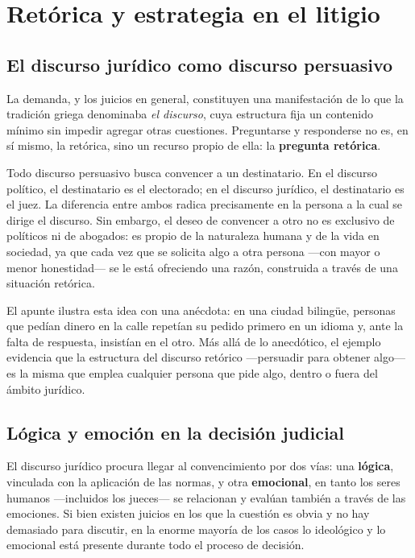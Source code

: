 \documentclass[12pt,oneside]{book}
\begin{document}
\chapter[Retórica y estrategia en el litigio]{Retórica y estrategia en el litigio}

\section{El discurso jurídico como discurso persuasivo}

La demanda, y los juicios en general, constituyen una manifestación de lo que la tradición griega denominaba \textit{el discurso}, cuya estructura fija un contenido mínimo sin impedir agregar otras cuestiones. Preguntarse y responderse no es, en sí mismo, la retórica, sino un recurso propio de ella: la \textbf{pregunta retórica}.

Todo discurso persuasivo busca convencer a un destinatario. En el discurso político, el destinatario es el electorado; en el discurso jurídico, el destinatario es el juez. La diferencia entre ambos radica precisamente en la persona a la cual se dirige el discurso. Sin embargo, el deseo de convencer a otro no es exclusivo de políticos ni de abogados: es propio de la naturaleza humana y de la vida en sociedad, ya que cada vez que se solicita algo a otra persona —con mayor o menor honestidad— se le está ofreciendo una razón, construida a través de una situación retórica.

\begin{note}
El apunte ilustra esta idea con una anécdota: en una ciudad bilingüe, personas que pedían dinero en la calle repetían su pedido primero en un idioma y, ante la falta de respuesta, insistían en el otro. Más allá de lo anecdótico, el ejemplo evidencia que la estructura del discurso retórico —persuadir para obtener algo— es la misma que emplea cualquier persona que pide algo, dentro o fuera del ámbito jurídico.
\end{note}

\section{Lógica y emoción en la decisión judicial}

El discurso jurídico procura llegar al convencimiento por dos vías: una \textbf{lógica}, vinculada con la aplicación de las normas, y otra \textbf{emocional}, en tanto los seres humanos —incluidos los jueces— se relacionan y evalúan también a través de las emociones. Si bien existen juicios en los que la cuestión es obvia y no hay demasiado para discutir, en la enorme mayoría de los casos lo ideológico y lo emocional está presente durante todo el proceso de decisión.
\end{document}
